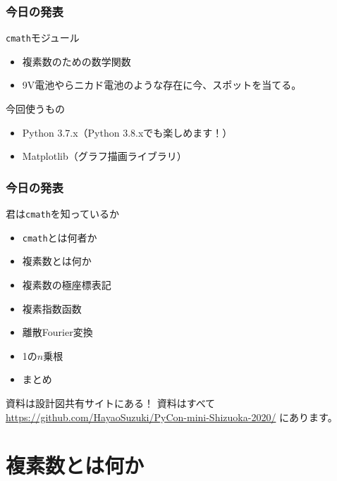 \documentclass[dvipdfmx,11pt,notheorems]{beamer}
\theoremstyle{definition}
\begin{document}
\begin{frame}\frametitle{今日の発表}

\begin{block}{\texttt{cmath}モジュール}
\begin{itemize}
\item 複素数のための数学関数
\item 9V電池やらニカド電池のような存在に今、スポットを当てる。
\end{itemize}
\end{block}

\begin{block}{今回使うもの}
\begin{itemize}
\item Python 3.7.x（Python 3.8.xでも楽しめます！）
\item Matplotlib（グラフ描画ライブラリ）
\end{itemize}
\end{block}

\end{frame}

\begin{frame}\frametitle{今日の発表}

\begin{block}{君は\texttt{cmath}を知っているか}
\begin{itemize}
\item \texttt{cmath}とは何者か
\item 複素数とは何か
\item 複素数の極座標表記
\item 複素指数函数
\item 離散Fourier変換
\item 1の$n$乗根
\item まとめ
\end{itemize}
\end{block}

\begin{exampleblock}{資料は設計図共有サイトにある！}
資料はすべて
\url{https://github.com/HayaoSuzuki/PyCon-mini-Shizuoka-2020/}
にあります。
\end{exampleblock}

\end{frame}

\section{複素数とは何か}
\end{document}
